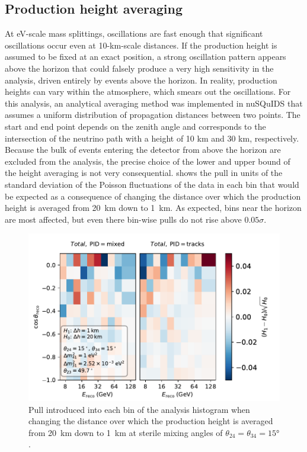 \subsection{Production height averaging}
\label{sec:prod-height-avg-nusquids}
At eV-scale mass splittings, oscillations are fast enough that significant oscillations occur even at 10-km-scale distances.
If the production height is assumed to be fixed at an exact position, a strong oscillation pattern appears above the horizon that could falsely produce a very high sensitivity in the analysis, driven entirely by events above the horizon.
In reality, production heights can vary within the atmosphere, which smears out the oscillations.
For this analysis, an analytical averaging method was implemented in nuSQuIDS that assumes a uniform distribution of propagation distances between two points.
The start and end point depends on the zenith angle and corresponds to the intersection of the neutrino path with a height of 10 km and 30 km, respectively. Because the bulk of events entering the detector from above the horizon are excluded from the analysis, the precise choice of the lower and upper bound of the height averaging is not very consequential.  shows the pull in units of the standard deviation of the Poisson fluctuations of the data in each bin that would be expected as a consequence of changing the distance over which the production height is averaged from \SI{20}{\kilo\metre} down to \SI{1}{\kilo\metre}. As expected, bins near the horizon are most affected, but even there bin-wise pulls do not rise above $0.05\sigma$.
\begin{figure}
    \centering
    \includegraphics{figures/measurement/sterile_analysis/pull_prod_height_range_1km_vs_20_km_th24_15_deg_th34_15_deg_verification_sample.pdf}
    \caption{Pull introduced into each bin of the analysis histogram when changing the distance over which the production height is averaged from \SI{20}{\kilo\metre} down to \SI{1}{\kilo\metre} at sterile mixing angles of $\theta_{24}=\theta_{34}=\ang{15}$.\label{fig:averaging-height-effect}}
\end{figure}

